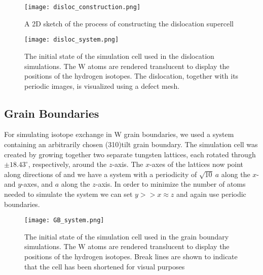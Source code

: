 \begin{figure}[!ht]
\center
\texttt{[image: disloc\_construction.png]}
\caption{A 2D sketch of the process of constructing the dislocation supercell}
\label{Fig:disloc_construction}
\end{figure}


\begin{figure}[!ht]
\center
\texttt{[image: disloc\_system.png]}
\caption{The initial state of the simulation cell used in the dislocation simulations. 
The W atoms are rendered translucent to display the positions of the hydrogen isotopes. 
The dislocation, together with its periodic images, is visualized using a defect mesh.}
\label{Fig:disloc_system}
\end{figure}

\subsection{Grain Boundaries}
For simulating isotope exchange in W grain boundaries, we used a system containing an arbitrarily chosen \hkl(310)\hkl[001] tilt grain boundary. The simulation cell was created by growing together two separate tungsten lattices, each rotated through $\pm18.43^\circ$, respectively, around the $z$-axis. 
The $x$-axes of the lattices now point along directions of  and we have a system with a periodicity of $\sqrt{10}~a$ along the $x$- and $y$-axes, and $a$ along the $z$-axis. 
In order to minimize the number of atoms needed to simulate the system we can set $y >> x \approx z$ and again use periodic boundaries.


\begin{figure}[!ht]
\center
\texttt{[image: GB\_system.png]}
\caption{The initial state of the simulation cell used in the grain boundary simulations. 
The W atoms are rendered translucent to display the positions of the hydrogen isotopes. Break lines are shown to indicate that the cell has been shortened for visual purposes}
\label{Fig:GB_system}
\end{figure}


